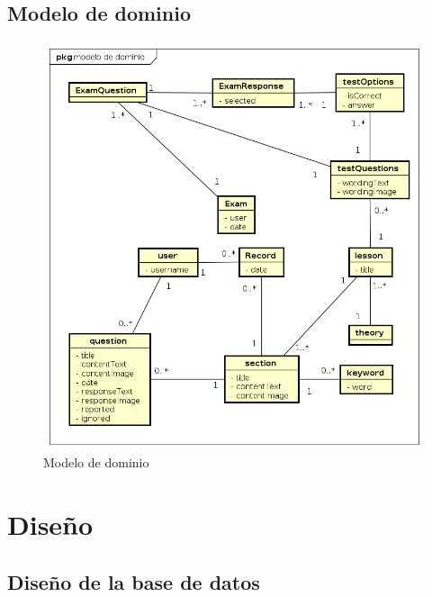 \documentclass[openright,twoside,10pt]{book}
\begin{document}
    \vspace*{\fill} \newpage
    
    \subsection{Modelo de dominio}\label{modelo-de-dominio}
    
    \vspace*{\fill}
    
    \begin{figure}[H]
        \begin{center}
            \includegraphics[width=\textwidth]{img/astah/analisis/dominio/modelo.png}
        \end{center}
        \caption{Modelo de dominio}
    \end{figure}
    
    \vspace*{\fill}
    
    \section{Diseño}\label{diseuxf1o}
    
    \subsection{Diseño de la base de
    datos}\label{diseuxf1o-de-la-base-de-datos}
    
\end{document}
